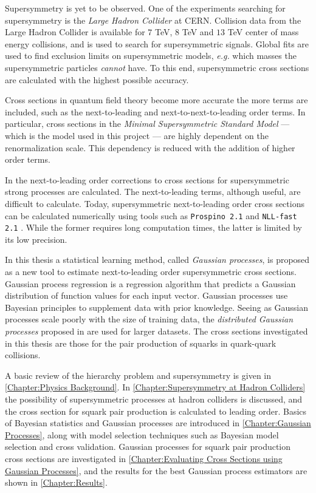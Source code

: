 \documentclass[twoside,english]{uiofysmaster}
\begin{document}
Supersymmetry is yet to be observed. One of the experiments searching for supersymmetry is the \textit{Large Hadron Collider} at CERN. Collision data from the Large Hadron Collider is available for $7$ TeV, $8$ TeV and $13$ TeV center of mass energy collisions, and is used to search for supersymmetric signals. Global fits are used to find exclusion limits on supersymmetric models, \textit{e.g.} which masses the supersymmetric particles \textit{cannot} have. To this end, supersymmetric cross sections are calculated with the highest possible accuracy.

Cross sections in quantum field theory become more accurate the more terms are included, such as the next-to-leading and next-to-next-to-leading order terms. In particular, cross sections in the \textit{Minimal Supersymmetric Standard Model} --- which is the model used in this project --- are highly dependent on the renormalization scale. This dependency is reduced with the addition of higher order terms. 

In \cite{beenakker1997squark} the next-to-leading order corrections to cross sections for supersymmetric strong processes are calculated. The next-to-leading terms, although useful, are difficult to calculate. Today, supersymmetric next-to-leading order cross sections can be calculated numerically using tools such as \verb|Prospino 2.1| \cite{beenakker1996prospino} and \verb|NLL-fast 2.1| \cite{beenakker2016nlo+}. While the former requires long computation times, the latter is limited by its low precision. 

In this thesis a statistical learning method, called \textit{Gaussian processes}, is proposed as a new tool to estimate next-to-leading order supersymmetric cross sections. Gaussian process regression is a regression algorithm that predicts a Gaussian distribution of function values for each input vector. Gaussian processes use Bayesian principles to supplement data with prior knowledge. Seeing as Gaussian processes scale poorly with the size of training data, the \textit{distributed Gaussian processes} proposed in \cite{deisenroth2015distributed} are used for larger datasets. The cross sections investigated in this thesis are those for the pair production of squarks in quark-quark collisions.

A basic review of the hierarchy problem and supersymmetry is given in \autoref{Chapter:Physics Background}. In \autoref{Chapter:Supersymmetry at Hadron Colliders} the possibility of supersymmetric processes at hadron colliders is discussed, and the cross section for squark pair production is calculated to leading order. Basics of Bayesian statistics and Gaussian processes are introduced in \autoref{Chapter:Gaussian Processes}, along with model selection techniques such as Bayesian model selection and cross validation. Gaussian processes for squark pair production cross sections are investigated in \autoref{Chapter:Evaluating Cross Sections using Gaussian Processes}, and the results for the best Gaussian process estimators are shown in \autoref{Chapter:Results}.
\end{document}

